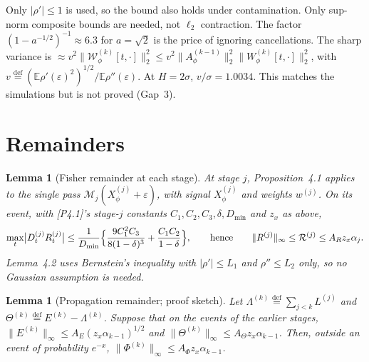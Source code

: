 \documentclass[11pt]{article}
\newcommand{\E}{\mathbb{E}}
\newcommand{\defeq}{\stackrel{\mathrm{def}}{=}}
\newcommand{\norm}[1]{\lVert#1\rVert}
\newcommand{\Wcal}{\mathcal W}
\newtheorem{lemma}[proposition]{Lemma}
\theoremstyle{definition}
\begin{document}
Only \(|\rho'|\le1\) is used, so the bound also holds under contamination.
Only sup-norm composite bounds are needed, not \(\ell_2\) contraction.  The
factor \((1-a^{-1/2})^{-1}\approx6.3\) for \(a=\sqrt2\) is the price of
ignoring cancellations.  The sharp variance is
\(\approx v^2\norm{\Wcal^{(k)}_\phi[t,\cdot]}_2^2\le
v^2\norm{A^{(k-1)}_\phi}_2^2\norm{W^{(k)}_\phi[t,\cdot]}_2^2\), with
\(v\defeq(\E\rho'(\varepsilon)^2)^{1/2}/\E\rho''(\varepsilon)\).  At
\(H=2\sigma\), \(v/\sigma=1.0034\).  This matches the simulations but is not
proved (Gap~3).

\section{Remainders}

\begin{lemma}[Fisher remainder at each stage]\label{lem:fisher}
At stage \(j\), Proposition~4.1 applies to the single pass
\(\mathcal M_j(X^{(j)}_\phi+\varepsilon)\), with signal \(X^{(j)}_\phi\) and weights
\(w^{(j)}\).  On its event, with [P4.1]'s stage-\(j\) constants
\(C_1,C_2,C_3,\delta,D_{\min}\) and \(z_x\) as above,
\[
  \max_t\bigl|D^{(j)}_tR^{(j)}_t\bigr|\le\frac1{D_{\min}}\Bigl\{
    \frac{9C_1^2C_3}{8(1-\delta)^3}+\frac{C_1C_2}{1-\delta}\Bigr\},
  \qquad\text{hence}\qquad
  \norm{R^{(j)}}_\infty\le\mathcal R^{(j)}\le A_Rz_x\alpha_j .
\]
Lemma~4.2 uses Bernstein's inequality with \(|\rho'|\le L_1\) and
\(\rho''\le L_2\) only, so no Gaussian assumption is needed.
\end{lemma}

\begin{lemma}[Propagation remainder; proof sketch]\label{lem:phi}
Let \(\Lambda^{(k)}\defeq\sum_{j<k}L^{(j)}\) and
\(\Theta^{(k)}\defeq E^{(k)}-\Lambda^{(k)}\).  Suppose that on the events of
the earlier stages, \(\norm{E^{(k)}}_\infty\le A_E(z_x\alpha_{k-1})^{1/2}\)
and \(\norm{\Theta^{(k)}}_\infty\le A_\Theta z_x\alpha_{k-1}\).  Then,
outside an event of probability \(e^{-x}\),
\(\norm{\Phi^{(k)}}_\infty\le A_\Phi z_x\alpha_{k-1}\).
\end{lemma}
\end{document}

